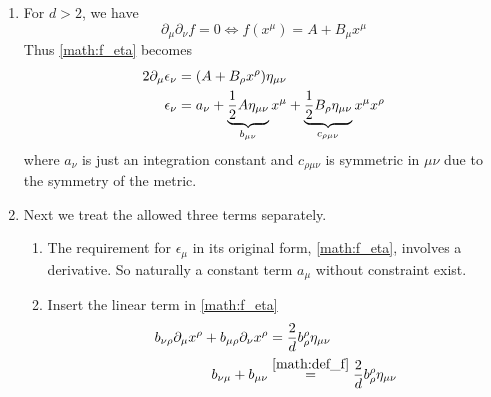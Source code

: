 \begin{enumerate}
	\item For $d > 2$, we have 
		\begin{equation*}
			\partial_\mu \partial_\nu f = 0 \Leftrightarrow f(x^\mu) = A + B_\mu x^\mu
		\end{equation*}
		Thus \eqref{math:f_eta} becomes
		\begin{align}
			2 \partial_\mu \epsilon_\nu  &= (A + B_\rho x^\rho) \eta_{\mu\nu} \notag \\
			\epsilon_\nu &= a_\nu + \underbrace{\frac{1}{2}A \eta_{\mu\nu}}_{b_{\mu\nu}} x^\mu + \underbrace{\frac{1}{2} B_\rho \eta_{\mu\nu}}_{c_{\rho\mu\nu}} x^\mu x^\rho
		\end{align}
		where $a_\nu$ is just an integration constant and $c_{\rho\mu\nu}$ is symmetric in $\mu\nu$ due to the symmetry of the metric.
		
	\item Next we treat the allowed three terms separately.
		\begin{enumerate}
			\item The requirement for $\epsilon_\mu$ in its original form, \eqref{math:f_eta}, involves a derivative. So naturally a constant term $a_\mu$ without constraint exist.
			\item Insert the linear term in \eqref{math:f_eta}
				\begin{align*}
					b_{\nu\rho}\partial_\mu  x^\rho + b_{\mu \rho}\partial_\nu  x^\rho &= \frac{2}{d} b^\rho_\rho \eta_{\mu\nu} \\
					b_{\nu\mu} + b_{\mu\nu} &\stackrel{\eqref{math:def_f}}{=} \frac{2}{d} b^\rho_\rho \eta_{\mu\nu}
				\end{align*}


\end{enumerate}
\end{enumerate}
